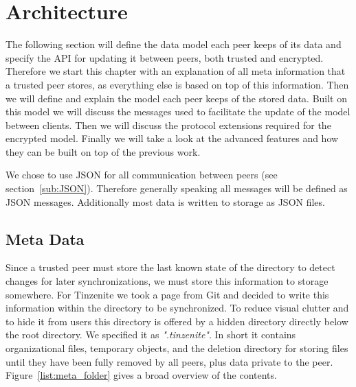 \chapter{Architecture}
\label{chap:architecture}

The following section will define the data model each peer keeps of its data and specify the API for updating it between peers, both trusted and encrypted.
Therefore we start this chapter with an explanation of all meta information that a trusted peer stores, as everything else is based on top of this information.
Then we will define and explain the model each peer keeps of the stored data.
Built on this model we will discuss the messages used to facilitate the update of the model between clients.
Then we will discuss the protocol extensions required for the encrypted model.
Finally we will take a look at the advanced features and how they can be built on top of the previous work.

We chose to use JSON for all communication between peers (see section~\ref{sub:JSON}).
Therefore generally speaking all messages will be defined as JSON messages.
Additionally most data is written to storage as JSON files.

\section{Meta Data}
\label{sec:Meta Data}

Since a trusted peer must store the last known state of the directory to detect changes for later synchronizations, we must store this information to storage somewhere.
For Tinzenite we took a page from Git and decided to write this information within the directory to be synchronized.
To reduce visual clutter and to hide it from users this directory is offered by a hidden directory directly below the root directory.
We specified it as \textit{".tinzenite"}.
In short it contains organizational files, temporary objects, and the deletion directory for storing files until they have been fully removed by all peers, plus data private to the peer.
Figure~\ref{list:meta_folder} gives a broad overview of the contents.

